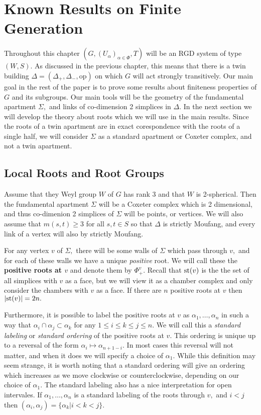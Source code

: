 \documentclass[class=book, crop=false,12 pt]{standalone}
\begin{document}
\chapter{Known Results on Finite Generation}
\label{ch:known}

Throughout this chapter $(G,(U_\alpha)_{\alpha\in \Phi},T)$ will be an RGD system of type $(W,S).$ As discussed in the previous chapter, this means that there is a twin building $\Delta=(\Delta_+,\Delta_-,\mathrm{op})$ on which $G$ will act strongly transitively. Our main goal in the rest of the paper is to prove some results about finiteness properties of $G$ and its subgroups. Our main tools will be the geometry of the fundamental apartment $\Sigma,$ and links of co-dimension 2 simplices in $\Delta.$ In the next section we will develop the theory about roots which we will use in the main results. Since the roots of a twin apartment are in exact corespondence with the roots of a single half, we will consider $\Sigma$ as a standard apartment or Coxeter complex, and not a twin apartment.

\section{Local Roots and Root Groups}
Assume that they Weyl group $W$ of $G$ has rank 3 and that $W$ is 2-spherical. Then the fundamental apartment $\Sigma$ will be a Coxeter complex which is 2 dimensional, and thus co-dimenion 2 simplices of $\Sigma$ will be points, or vertices. We will also assume that $m(s,t)\ge 3$ for all $s,t\in S$ so that $\Delta$ is strictly Moufang, and every link of a vertex will also by strictly Moufang.

For any vertex $v$ of $\Sigma,$ there will be some walls of $\Sigma$ which pass through $v,$ and for each of these walls we have a unique \emph{positive} root. We will call these the \textbf{positive roots at $v$} and denote them by $\Phi_+^v.$ Recall that $\mathrm{st}(v)$ is the the set of all simplices with $v$ as a face, but we will view it as a chamber complex and only consider the chambers with $v$ as a face. If there are $n$ positive roots at $v$ then $|\mathrm{st}(v)|=2n.$ 

Furthermore, it is possible to label the positive roots at $v$ as $\alpha_1,\dots,\alpha_n$ in such a way that $\alpha_i\cap \alpha_j\subset \alpha_k$ for any $1\le i\le k\le j\le n.$ We will call this a \emph{standard labeling} or \emph{standard ordering} of the positive roots at $v.$ This ordering is unique up to a reversal of the form $\alpha_i\mapsto \alpha_{n+1-i}.$ In most cases this reversal will not matter, and when it does we will specify a choice of $\alpha_1.$ While this definition may seem strange, it is worth noting that a standard ordering will give an ordering which increases as we move clockwise or counterclockwise, depending on our choice of $\alpha_1.$ The standard labeling also has a nice interpretation for open intervales. If $\alpha_1,\dots,\alpha_n$ is a standard labeling of the roots through $v,$ and $i<j$ then $(\alpha_i,\alpha_j)=\{\alpha_k|i<k<j\}.$
\end{document}
